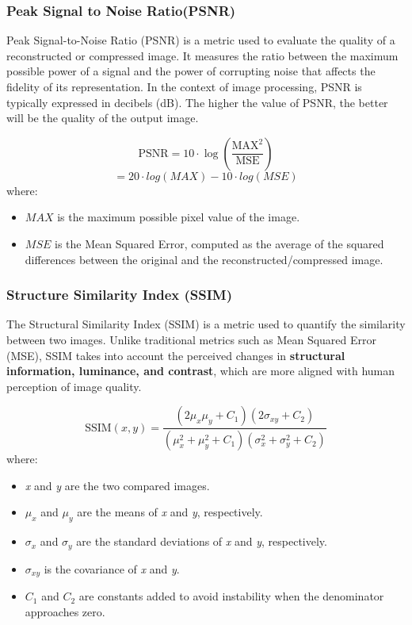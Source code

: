 \documentclass{article}
\begin{document}
        \subsubsection{Peak Signal to Noise Ratio(PSNR)}
        Peak Signal-to-Noise Ratio (PSNR) is a metric used to evaluate the quality of a reconstructed or compressed image. It measures the ratio between the maximum possible power of a signal and the power of corrupting noise that affects the fidelity of its representation. In the context of image processing, PSNR is typically expressed in decibels (dB).  The higher the value of PSNR, the better will be the quality of the output image. 
        
\[
\text{PSNR} = 10 \cdot \log \left( \frac{{\text{MAX}^2}}{{\text{MSE}}} \right)
\]
\[= 20 \cdot log(MAX) - 10 \cdot log(MSE)\]
where:

\begin{itemize}
    \item \(MAX\) is the maximum possible pixel value of the image.
    \item \(MSE\) is the Mean Squared Error, computed as the average of the squared differences between the original and the reconstructed/compressed image.
\end{itemize}
        \subsubsection{Structure Similarity Index (SSIM)}
The Structural Similarity Index (SSIM) is a metric used to quantify the similarity between two images. Unlike traditional metrics such as Mean Squared Error (MSE), SSIM takes into account the perceived changes in \textbf{structural information, luminance, and contrast}, which are more aligned with human perception of image quality. 

\[
\text{SSIM}(x, y) = \frac{{(2\mu_x\mu_y + C_1)(2\sigma_{xy} + C_2)}}{{(\mu_x^2 + \mu_y^2 + C_1)(\sigma_x^2 + \sigma_y^2 + C_2)}}

\]
where:
\begin{itemize}
    \item \textit{x} and \textit{y} are the two compared images.
    \item \(\mu_{x}\) and \(\mu_{y}\) are the means of \textit{x} and \textit{y}, respectively.
    \item \(\sigma_{x}\) and \(\sigma_{y}\) are the standard deviations of \textit{x} and \textit{y}, respectively.
    \item \(\sigma_{xy}\) is the covariance of \textit{x} and\textit{ y}.
    \item \(C_{1}\) and \(C_{2}\) are constants added to avoid instability when the denominator approaches zero.
\end{itemize}
 
\end{document}
